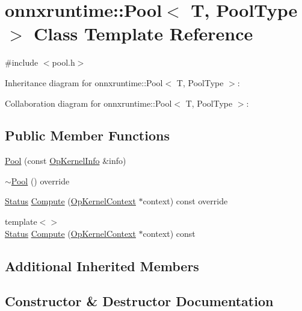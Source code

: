 \hypertarget{classonnxruntime_1_1Pool}{}\section{onnxruntime\+:\+:Pool$<$ T, Pool\+Type $>$ Class Template Reference}
\label{classonnxruntime_1_1Pool}


{\ttfamily \#include $<$pool.\+h$>$}



Inheritance diagram for onnxruntime\+:\+:Pool$<$ T, Pool\+Type $>$\+:


Collaboration diagram for onnxruntime\+:\+:Pool$<$ T, Pool\+Type $>$\+:
\subsection*{Public Member Functions}
\begin{DoxyCompactItemize}
\item 
\mbox{\hyperlink{classonnxruntime_1_1Pool_acac53fc4ac4307d7b3bcd162015efcb4}{Pool}} (const \mbox{\hyperlink{classonnxruntime_1_1OpKernelInfo}{Op\+Kernel\+Info}} \&info)
\item 
\mbox{\hyperlink{classonnxruntime_1_1Pool_a66cabaed967e0f1f6f5e716d3100ca44}{$\sim$\+Pool}} () override
\item 
\mbox{\hyperlink{classonnxruntime_1_1common_1_1Status}{Status}} \mbox{\hyperlink{classonnxruntime_1_1Pool_afc168d47c3d4a0a67c40bd3e14bd1431}{Compute}} (\mbox{\hyperlink{classonnxruntime_1_1OpKernelContext}{Op\+Kernel\+Context}} $\ast$context) const override
\item 
{\footnotesize template$<$$>$ }\\\mbox{\hyperlink{classonnxruntime_1_1common_1_1Status}{Status}} \mbox{\hyperlink{classonnxruntime_1_1Pool_a10f34e111b6792c1e543610c4c91765e}{Compute}} (\mbox{\hyperlink{classonnxruntime_1_1OpKernelContext}{Op\+Kernel\+Context}} $\ast$context) const
\end{DoxyCompactItemize}
\subsection*{Additional Inherited Members}


\subsection{Constructor \& Destructor Documentation}
\mbox{\label{classonnxruntime_1_1Pool_acac53fc4ac4307d7b3bcd162015efcb4}} 
